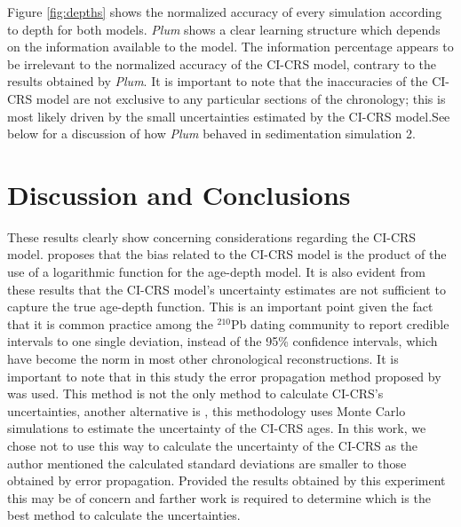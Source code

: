 \documentclass [10pt] {article}
\begin{document}
Figure \ref{fig:depths} shows the normalized accuracy of every simulation according to depth for both models.
\textit{Plum} shows a clear learning structure which depends on the information available to the model.
The information percentage appears to be irrelevant to the normalized accuracy of the CI-CRS model, contrary to the results obtained by \textit{Plum}.
It is important to note that the inaccuracies of the CI-CRS model are not exclusive to any particular sections of the chronology; this is most likely driven by the small uncertainties estimated by the CI-CRS model.See below for a discussion of how \textit{Plum} behaved in sedimentation simulation 2.   


\section{Discussion and Conclusions}
These results clearly show concerning considerations regarding the CI-CRS model. 
\citet{Aquino2018} proposes that the bias related to the CI-CRS model is the product of the use of a logarithmic function for the age-depth model. 
It is also evident from these results that the CI-CRS model's uncertainty estimates are not sufficient to capture the true age-depth function. 
This is an important point given the fact that it is common practice among the $^{210}$Pb dating community to report credible intervals to one single deviation, instead of the 95\% confidence intervals, which have become the norm in most other chronological reconstructions.
It is important to note that in this study the error propagation method proposed by \citet{Appleby2001} was used.
This method is not the only method to calculate CI-CRS's uncertainties, another alternative is \citet{Sanchez-Cabeza2014}, this methodology uses Monte Carlo simulations to estimate the uncertainty of the CI-CRS ages.
In this work, we chose not to use this way to calculate the uncertainty of the CI-CRS as the author mentioned the calculated standard deviations are  smaller to those obtained by error propagation.
Provided the results obtained by this experiment this may be of concern and farther work is required to determine which is the best method to calculate the uncertainties. 
\end{document}
